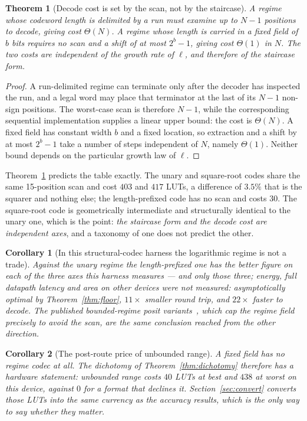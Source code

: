 \documentclass[11pt]{article}
\newtheorem{theorem}{Theorem}
\newtheorem{corollary}{Corollary}
\theoremstyle{definition}
\begin{document}
\begin{theorem}[Decode cost is set by the scan, not by the staircase]
\label{thm:scan}
A regime whose codeword length is delimited by a run must examine up to $N-1$
positions to decode, giving cost $\Theta(N)$. A regime whose length is carried in
a fixed field of $b$ bits requires no scan and a shift of at most $2^{b}-1$,
giving cost $\Theta(1)$ in $N$. The two costs are independent of the growth rate
of $\ell$, and therefore of the staircase form.
\end{theorem}
\begin{proof}
A run-delimited regime can terminate only after the decoder has inspected the
run, and a legal word may place that terminator at the last of its $N-1$
non-sign positions.  The worst-case scan is therefore $N-1$, while the
corresponding sequential implementation supplies a linear upper bound: the
cost is $\Theta(N)$.  A fixed field has constant width $b$ and a fixed
location, so extraction and a shift by at most $2^b-1$ take a number of steps
independent of $N$, namely $\Theta(1)$.  Neither bound depends on the
particular growth law of $\ell$.
\end{proof}

Theorem~\ref{thm:scan} predicts the table exactly. The unary and square-root codes
share the same 15-position scan and cost $403$ and $417$ LUTs, a difference of
$3.5\%$ that is the squarer and nothing else; the length-prefixed code has no scan
and costs $30$. The square-root code is geometrically intermediate and structurally
identical to the unary one, which is the point: \emph{the staircase form and the
decode cost are independent axes}, and a taxonomy of one does not predict the
other.

\begin{corollary}[In this structural-codec harness the logarithmic regime is not
a trade]
\label{cor:takumwins}
Against the unary regime the length-prefixed one has the better figure on each of
the three axes this harness measures --- and only those three; energy, full
datapath latency and area on other devices were not measured:
asymptotically optimal by Theorem~\ref{thm:floor}, $11\times$ smaller round trip,
and $22\times$ faster to decode. The published bounded-regime posit
variants~\cite{positgap}, which cap the regime field precisely to avoid the scan,
are the same conclusion reached from the other direction.
\end{corollary}

\begin{corollary}[The post-route price of unbounded range]
\label{cor:price}
A fixed field has no regime codec at all. The dichotomy of
Theorem~\ref{thm:dichotomy} therefore has a hardware statement: unbounded range
costs $40$ LUTs at best and $438$ at worst on this device, against $0$ for a
format that declines it. Section~\ref{sec:convert} converts those LUTs into the
same currency as the accuracy results, which is the only way to say whether they
matter.
\end{corollary}
\end{document}

